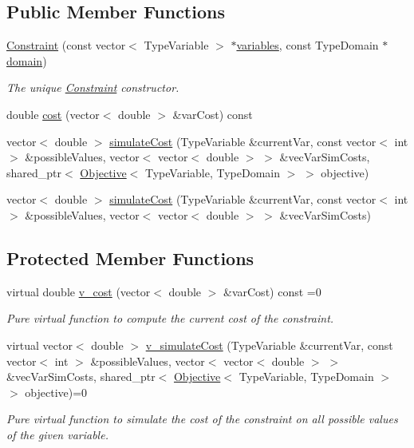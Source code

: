 \subsection*{Public Member Functions}
\begin{DoxyCompactItemize}
\item 
\hyperlink{classghost_1_1Constraint_af2b5d5f541f64e548bc6c93bba1ba2b8}{Constraint} (const vector$<$ Type\-Variable $>$ $\ast$\hyperlink{classghost_1_1Constraint_a827e487bd77c8dbc4701d1dfae39678a}{variables}, const Type\-Domain $\ast$\hyperlink{classghost_1_1Constraint_a0ea15d113ab23ddb6ad74be72f7ac90d}{domain})
\begin{DoxyCompactList}\small\item\em The unique \hyperlink{classghost_1_1Constraint}{Constraint} constructor. \end{DoxyCompactList}\item 
double \hyperlink{classghost_1_1Constraint_a5051092934738b004fe848190a5aa9a5}{cost} (vector$<$ double $>$ \&var\-Cost) const 
\item 
vector$<$ double $>$ \hyperlink{classghost_1_1Constraint_a173958081ed2cfad938cead81b684455}{simulate\-Cost} (Type\-Variable \&current\-Var, const vector$<$ int $>$ \&possible\-Values, vector$<$ vector$<$ double $>$ $>$ \&vec\-Var\-Sim\-Costs, shared\-\_\-ptr$<$ \hyperlink{classghost_1_1Objective}{Objective}$<$ Type\-Variable, Type\-Domain $>$ $>$ objective)
\item 
vector$<$ double $>$ \hyperlink{classghost_1_1Constraint_ae5312daf02d5a4147dd4b519f2355712}{simulate\-Cost} (Type\-Variable \&current\-Var, const vector$<$ int $>$ \&possible\-Values, vector$<$ vector$<$ double $>$ $>$ \&vec\-Var\-Sim\-Costs)
\end{DoxyCompactItemize}
\subsection*{Protected Member Functions}
\begin{DoxyCompactItemize}
\item 
virtual double \hyperlink{classghost_1_1Constraint_ac67f7952cdf7212327b7db506225d12c}{v\-\_\-cost} (vector$<$ double $>$ \&var\-Cost) const =0
\begin{DoxyCompactList}\small\item\em Pure virtual function to compute the current cost of the constraint. \end{DoxyCompactList}\item 
virtual vector$<$ double $>$ \hyperlink{classghost_1_1Constraint_a8dd05c04dbce51e88a6301e9332fb2f5}{v\-\_\-simulate\-Cost} (Type\-Variable \&current\-Var, const vector$<$ int $>$ \&possible\-Values, vector$<$ vector$<$ double $>$ $>$ \&vec\-Var\-Sim\-Costs, shared\-\_\-ptr$<$ \hyperlink{classghost_1_1Objective}{Objective}$<$ Type\-Variable, Type\-Domain $>$ $>$ objective)=0
\begin{DoxyCompactList}\small\item\em Pure virtual function to simulate the cost of the constraint on all possible values of the given variable. \end{DoxyCompactList}\end{DoxyCompactItemize}
